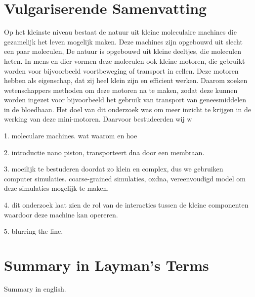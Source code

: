 \chapter*{Vulgariserende Samenvatting}

Op het kleinste niveau bestaat de natuur uit kleine moleculaire machines die gezamelijk
het leven mogelijk maken. Deze machines zijn opgebouwd uit slecht een paar moleculen,
De natuur is opgebouwd uit kleine deeltjes, die moleculen heten. In mens en dier vormen
deze moleculen ook kleine motoren, die gebruikt worden voor bijvoorbeeld voortbeweging of
transport in cellen. Deze motoren hebben als eigenschap, dat zij heel klein zijn en
efficient werken. Daarom zoeken wetenschappers methoden om deze motoren na te maken,
zodat deze kunnen worden ingezet voor bijvoorbeeld het gebruik van transport van
geneesmiddelen in de bloedbaan.
Het doel van dit onderzoek was om meer inzicht te krijgen in de werking van deze
mini-motoren. Daarvoor bestudeerden wij  w

1. moleculare machines. wat waarom en hoe

2. introductie nano piston, transporteert dna door een membraan.

3. moeilijk te bestuderen doordat zo klein en complex, dus we gebruiken computer
simulaties. coarse-grained simulaties, oxdna, vereenvoudigd model om deze simulaties
mogelijk te maken.

4. dit onderzoek laat zien de rol van de interacties tussen de kleine componenten
waardoor deze machine kan opereren.

5. blurring the line.




\cleardoublepage
{}
\chapter*{Summary in Layman's Terms}
Summary in english.
